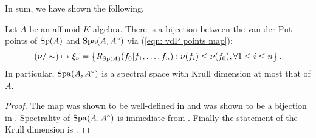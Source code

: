 In sum, we have shown the following. 
\begin{theorem}\label{thm: Huber-Schneider-vdP}
    Let $A$ be an affinoid $K$-algebra. There is a bijection between the van der Put points of $\mathrm{Sp}(A)$ and $\mathrm{Spa}(A,A^{\circ})$ via (\ref{eqn: vdP points map}):
    $$(\nu/\sim)\mapsto\xi_{\nu}=\left\{R_{\mathrm{Sp}(A)}(f_{0}|f_{1},\dots,f_{n}):\nu(f_{i})\leq\nu(f_{0}),\forall 1\leq i\leq n\right\}.$$
    In particular, $\mathrm{Spa}(A,A^{\circ})$ is a spectral space with Krull dimension at most that of $A$.
\end{theorem}
\begin{proof}
    The map was shown to be well-defined in  and was shown to be a bijection in . Spectrality of $\mathrm{Spa}(A,A^{\circ})$ is immediate from . Finally the statement of the Krull dimension is . 
\end{proof}